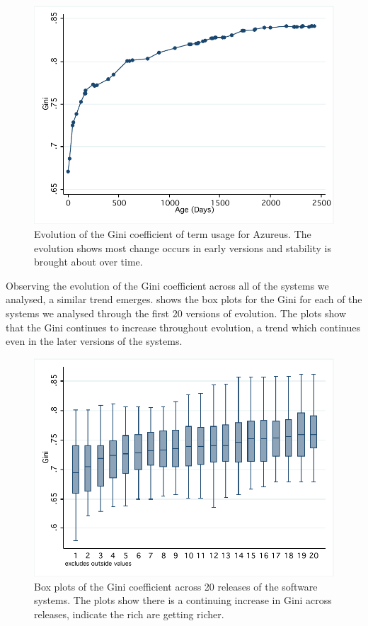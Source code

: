 \begin{figure}[t]
\centering
\includegraphics[width=\textwidth]{Figures/Vocab-AzureusGini.pdf}
\caption{Evolution of the Gini coefficient of term usage for Azureus. The evolution shows most change occurs in early versions and stability is brought about over time.}
\label{fig:vocab-gini-azureus}
\end{figure}

Observing the evolution of the Gini coefficient across all of the systems we analysed, a similar trend emerges.  shows the box plots for the Gini for each of the systems we analysed through the first 20 versions of evolution. The plots show that the Gini continues to increase throughout evolution, a trend which continues even in the later versions of the systems.

\begin{figure}[t]
\centering
\includegraphics[width=\textwidth]{Figures/Vocab-RSN20GiniBox.pdf}
\caption{Box plots of the Gini coefficient across 20 releases of the software systems. The plots show there is a continuing increase in Gini across releases, indicate the rich are getting richer.}
\label{fig:vocab-gini-rsn20-box}
\end{figure}

